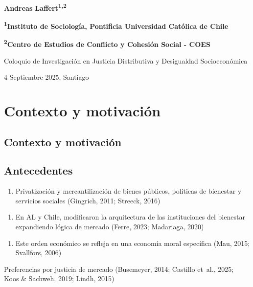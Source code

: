 \documentclass[
  spanish,
  letterpaper,
  DIV=11,
  numbers=noendperiod,
  oneside]{scrartcl}
\providecommand{\tightlist}{%
  \setlength{\itemsep}{0pt}\setlength{\parskip}{0pt}}
\begin{document}
\textbf{Andreas Laffert\textsuperscript{1,2}}

\textbf{\textsuperscript{1}Instituto de Sociología, Pontificia
Universidad Católica de Chile}

\textbf{\textsuperscript{2}Centro de Estudios de Conflicto y Cohesión
Social - COES}

Coloquio de Investigación en Justicia Distributiva y Desigualdad
Socioeconómica

4 Septiembre 2025, Santiago

\section{Contexto y motivación}\label{contexto-y-motivaciuxf3n}

\subsection{Contexto y motivación}\label{contexto-y-motivaciuxf3n-1}

\subsection{Antecedentes}\label{antecedentes}

\begin{enumerate}
\def\labelenumi{\arabic{enumi})}
\tightlist
\item
  Privatización y mercantilización de bienes públicos, políticas de
  bienestar y servicios sociales (Gingrich, 2011; Streeck, 2016)
\end{enumerate}

\begin{enumerate}
\def\labelenumi{\arabic{enumi})}
\setcounter{enumi}{1}
\tightlist
\item
  En AL y Chile, modificaron la arquitectura de las instituciones del
  bienestar expandiendo lógica de mercado (Ferre, 2023; Madariaga, 2020)
\end{enumerate}

\begin{enumerate}
\def\labelenumi{\arabic{enumi})}
\setcounter{enumi}{2}
\tightlist
\item
  Este orden económico se refleja en una economía moral específica (Mau,
  2015; Svallfors, 2006)
\end{enumerate}

Preferencias por justicia de mercado (Busemeyer, 2014; Castillo et~al.,
2025; Koos \& Sachweh, 2019; Lindh, 2015)
\end{document}
